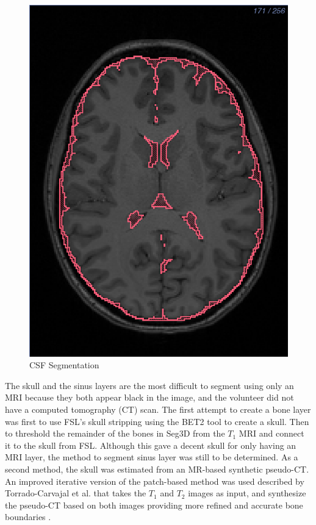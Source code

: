 \begin{figure}[H]
\begin{center}
\includegraphics[width=.49\textwidth]{Figures/CSF_seg}
\caption{CSF Segmentation}
\label{fig:csf}
\end{center}
\end{figure}

The skull and the sinus layers are the most difficult to segment using only an MRI because they both appear black in the image, and the volunteer did not have a computed tomography (CT) scan. The first attempt to create a bone layer was first to use FSL's skull stripping using the BET2 tool to create a skull. Then to threshold the remainder of the bones in Seg3D from the $T_1$ MRI and connect it to the skull from FSL. Although this gave a decent skull for only having an MRI layer, the method to segment sinus layer was still to be determined. As a second method, the skull was estimated from an MR-based synthetic pseudo-CT. An improved iterative version of the patch-based method was used described by Torrado-Carvajal et al. that takes the $T_1$ and $T_2$ images as input, and synthesize the pseudo-CT based on both images providing more refined and accurate bone boundaries \cite{ref:pseudoct}. 

